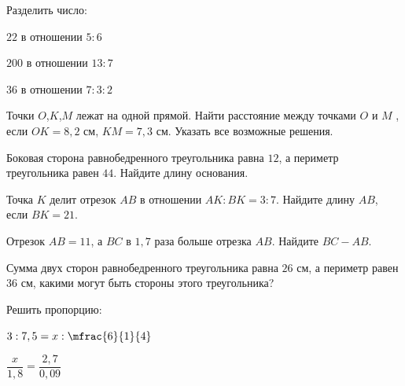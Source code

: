 \begin{class}[number=2]
	\begin{listofex}
		\item Разделить число:
		\begin{enumcols}[itemcolumns=3]
			\item \( 22 \) в отношении \( 5:6 \)
			\item \( 200 \) в отношении \( 13:7 \)
			\item \( 36 \) в отношении \( 7:3:2 \)
		\end{enumcols}
		\item Точки \( O \),\( K \),\( M \) лежат на одной прямой. Найти расстояние между
		точками \( O \) и \( M \) , если \( OK = 8,2 \) см, \( KM = 7,3 \) см. Указать все
		возможные решения.
		\item Боковая сторона равнобедренного треугольника равна \( 12 \), а периметр треугольника равен \( 44 \). Найдите длину основания.
		\item Точка \( K \) делит отрезок \( AB \) в отношении \( AK:BK=3:7 \). Найдите длину \( AB \), если \( BK=21 \).
		\item Отрезок \( AB=11 \), а \( BC \) в \( 1,7 \) раза больше отрезка \( AB \). Найдите \( BC-AB \).
		\item Сумма двух сторон равнобедренного треугольника равна \( 26 \) см, а
		периметр равен \( 36 \) см, какими могут быть стороны этого
		треугольника?
		\item Решить пропорцию:
		\begin{enumcols}[itemcolumns=2]
			\item \( 3:7,5=x:\mfrac{6}{1}{4}\)
			\item \( \dfrac{x}{1,8}=\dfrac{2,7}{0,09} \)
		\end{enumcols}
	\end{listofex}
\end{class}
%
%
